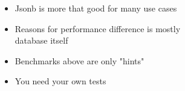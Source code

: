 \documentclass[usenames,dvipsnames, 18pt, compress, aspectratio=169]{beamer}
\begin{document}




\begin{frame}[fragile]
    \frametitle{}
    \vspace{10pt}
    \begin{itemize}[leftmargin=*, label={\MVRightarrow}]
        \item <+-> Jsonb is more that good for many use cases
        \item <+-> Reasons for performance difference is mostly \\database itself
        \item <+-> Benchmarks above are only "hints"
        \item <+-> You need your own tests
    \end{itemize}
\end{frame}
\end{document}
